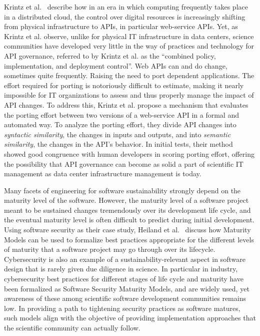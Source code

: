 \documentclass[11pt, oneside]{amsart}
\begin{document}
Krintz et al.~\cite{Krintz_WSSSPE} describe how in an era in which
computing frequently takes place in a distributed cloud, the control
over digital resources is increasingly shifting from physical
infrastructure to APIs, in particular web-service APIs. Yet, as Krintz
et al. observe, unlike for physical IT infrastructure in data centers,
science communities have developed very little in the way of practices and
technology for API governance, referred to by Krintz et al. as the
``combined policy, implementation, and deployment control''. Web APIs
can and do change, sometimes quite frequently. Raising the need to
port dependent applications. The effort required for porting is
notoriously difficult to estimate, making it nearly impossible for IT
organizations to assess and thus properly manage the impact of API
changes. To address this, Krintz et al. propose a mechanism that
evaluates the porting effort between two versions of a web-service API
in a formal and automated way. To analyze the porting effort, they
divide API changes into \emph{syntactic similarity}, the changes in
inputs and outputs, and into \emph{semantic similarity}, the changes
in the API's behavior. In initial tests, their method showed good
congruence with human developers in scoring porting effort, offering
the possibility that API governance can become as solid a part of
scientific IT management as data center infrastructure management is
today.

Many facets of engineering for software sustainability strongly depend
on the maturity level of the software. However, the maturity level of
a software project meant to be sustained changes tremendously over its
development life cycle, and the eventual maturity level is often
difficult to predict during initial development. Using software
security as their case study, Heiland et al.~\cite{Heiland_WSSSPE}
discuss how Maturity Models can be used to formalize best practices
appropriate for the different levels of maturity that a software
project may go through over its lifecycle. Cybersecurity is also an
example of a sustainability-relevant aspect in software design that is
rarely given due diligence in science. In particular in industry,
cybersecurity best practices for different stages of life cycle and
maturity have been formalized as Software Security Maturity Models,
and are widely used, yet awareness of these among scientific software
development communities remains low. In providing a path to tightening
security practices as software matures, such models align with the
objective of providing implementation approaches that the scientific
community can actually follow.
\end{document}
